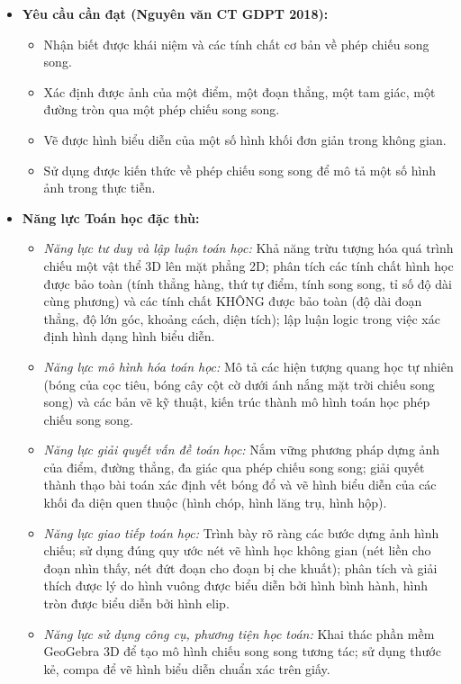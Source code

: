\documentclass[12pt, a4paper]{article}
\begin{document}
\begin{itemize}[leftmargin=1.2cm]
    \item \textbf{Yêu cầu cần đạt (Nguyên văn CT GDPT 2018):}
    \begin{itemize}[leftmargin=0.6cm]
        \item Nhận biết được khái niệm và các tính chất cơ bản về phép chiếu song song.
        \item Xác định được ảnh của một điểm, một đoạn thẳng, một tam giác, một đường tròn qua một phép chiếu song song.
        \item Vẽ được hình biểu diễn của một số hình khối đơn giản trong không gian.
        \item Sử dụng được kiến thức về phép chiếu song song để mô tả một số hình ảnh trong thực tiễn.
    \end{itemize}

    \item \textbf{Năng lực Toán học đặc thù:}
    \begin{itemize}[leftmargin=0.6cm]
        \item \textit{Năng lực tư duy và lập luận toán học:} Khả năng trừu tượng hóa quá trình chiếu một vật thể 3D lên mặt phẳng 2D; phân tích các tính chất hình học được bảo toàn (tính thẳng hàng, thứ tự điểm, tính song song, tỉ số độ dài cùng phương) và các tính chất KHÔNG được bảo toàn (độ dài đoạn thẳng, độ lớn góc, khoảng cách, diện tích); lập luận logic trong việc xác định hình dạng hình biểu diễn.
        \item \textit{Năng lực mô hình hóa toán học:} Mô tả các hiện tượng quang học tự nhiên (bóng của cọc tiêu, bóng cây cột cờ dưới ánh nắng mặt trời chiếu song song) và các bản vẽ kỹ thuật, kiến trúc thành mô hình toán học phép chiếu song song.
        \item \textit{Năng lực giải quyết vấn đề toán học:} Nắm vững phương pháp dựng ảnh của điểm, đường thẳng, đa giác qua phép chiếu song song; giải quyết thành thạo bài toán xác định vết bóng đổ và vẽ hình biểu diễn của các khối đa diện quen thuộc (hình chóp, hình lăng trụ, hình hộp).
        \item \textit{Năng lực giao tiếp toán học:} Trình bày rõ ràng các bước dựng ảnh hình chiếu; sử dụng đúng quy ước nét vẽ hình học không gian (nét liền cho đoạn nhìn thấy, nét đứt đoạn cho đoạn bị che khuất); phân tích và giải thích được lý do hình vuông được biểu diễn bởi hình bình hành, hình tròn được biểu diễn bởi hình elip.
        \item \textit{Năng lực sử dụng công cụ, phương tiện học toán:} Khai thác phần mềm GeoGebra 3D để tạo mô hình chiếu song song tương tác; sử dụng thước kẻ, compa để vẽ hình biểu diễn chuẩn xác trên giấy.
    \end{itemize}


\end{itemize}
\end{document}
